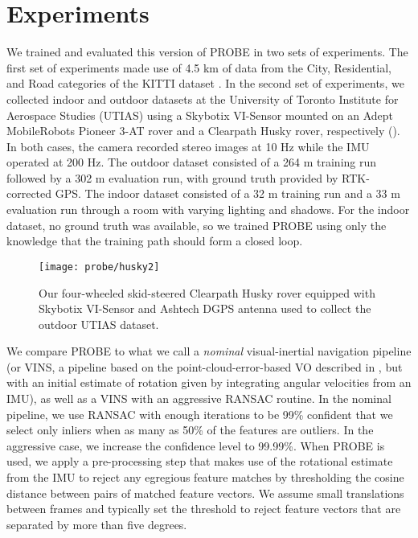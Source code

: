 \section{Experiments}
We trained and evaluated this version of PROBE in two sets of experiments.
The first set of experiments made use of 4.5 km of data from the City, Residential, and Road categories of the KITTI dataset \citep{Geiger2013-ky}.
In the second set of experiments, we collected indoor and outdoor datasets at the University of Toronto Institute for Aerospace Studies (UTIAS) using a Skybotix VI-Sensor mounted on an Adept MobileRobots Pioneer 3-AT rover and a Clearpath Husky rover, respectively ().
In both cases, the camera recorded stereo images at 10 Hz while the IMU operated at 200 Hz.
The outdoor dataset consisted of a 264 m training run followed by a 302 m evaluation run, with ground truth provided by RTK-corrected GPS.
The indoor dataset consisted of a 32 m training run and a 33 m evaluation run through a room with varying lighting and shadows.
For the indoor dataset, no ground truth was available, so we trained PROBE using only the knowledge that the training path should form a closed loop.

\begin{figure}
    \centering
    \texttt{[image: probe/husky2]}
    \caption{Our four-wheeled skid-steered Clearpath Husky rover equipped with Skybotix VI-Sensor and Ashtech DGPS antenna used to collect the outdoor UTIAS dataset.}
    \label{fig:probe_huskypic}
\end{figure}

We compare PROBE to what we call a \textit{nominal} visual-inertial navigation pipeline (or VINS, a pipeline based on the point-cloud-error-based VO described in , but with an initial estimate of rotation given by integrating angular velocities from an IMU), as well as a VINS with an aggressive RANSAC routine. In the nominal pipeline, we use RANSAC with enough iterations to be 99\% confident that we select only inliers when as many as 50\% of the features are outliers. In the aggressive case, we increase the confidence level to 99.99\%. When PROBE is used, we apply a pre-processing step that makes use of the rotational estimate from the IMU to reject any egregious feature matches by thresholding the cosine distance between pairs of matched feature vectors. We assume small translations between frames and typically set the threshold to reject feature vectors that are separated by more than five degrees. 

